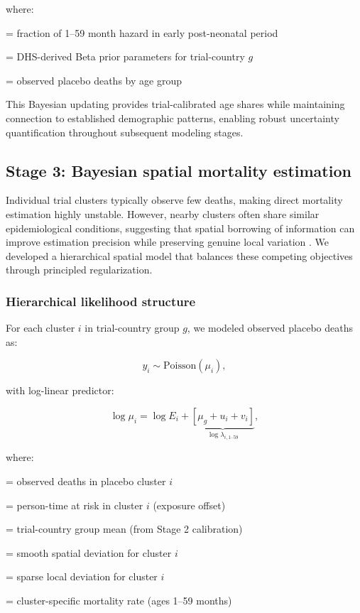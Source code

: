 \documentclass[11pt]{article}\usepackage[]{graphicx}\usepackage[]{xcolor}
\begin{document}
\noindent where:
\begin{description}[leftmargin=2em]
\item[$p_g$] = fraction of 1--59 month hazard in early post-neonatal period
\item[$\alpha_{g,0}, \beta_{g,0}$] = DHS-derived Beta prior parameters for trial-country $g$
\item[$d_{g,1\text{--}11}, d_{g,12\text{--}59}$] = observed placebo deaths by age group
\end{description}

This Bayesian updating provides trial-calibrated age shares while maintaining connection to established demographic patterns, enabling robust uncertainty quantification throughout subsequent modeling stages.

\subsection{Stage 3: Bayesian spatial mortality estimation}

Individual trial clusters typically observe few deaths, making direct mortality estimation highly unstable. However, nearby clusters often share similar epidemiological conditions, suggesting that spatial borrowing of information can improve estimation precision while preserving genuine local variation \citep{besag1991bym, riebler2016bym2}. We developed a hierarchical spatial model that balances these competing objectives through principled regularization.

\subsubsection{Hierarchical likelihood structure}

For each cluster $i$ in trial-country group $g$, we modeled observed placebo deaths as:

\begin{equation}
y_i \sim \text{Poisson}(\mu_i),
\end{equation}

\noindent with log-linear predictor:

\begin{equation}
\log \mu_i = \log E_i + \underbrace{[\mu_g + u_i + v_i]}_{\log \lambda_{i,1\text{--}59}},
\end{equation}

\noindent where:
\begin{description}[leftmargin=2em]
\item[$y_i$] = observed deaths in placebo cluster $i$
\item[$E_i$] = person-time at risk in cluster $i$ (exposure offset)
\item[$\mu_g$] = trial-country group mean (from Stage 2 calibration)
\item[$u_i$] = smooth spatial deviation for cluster $i$
\item[$v_i$] = sparse local deviation for cluster $i$
\item[$\lambda_{i,1\text{--}59}$] = cluster-specific mortality rate (ages 1--59 months)
\end{description}
\end{document}
